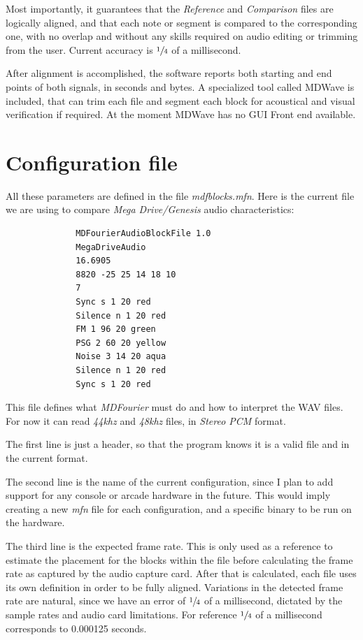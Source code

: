 \documentclass[10pt,a4paper]{report}
\begin{document}
Most importantly, it guarantees that the \textit{Reference} and \textit{Comparison} files are logically aligned, and that each note or segment is compared to the corresponding one, with no overlap and without any skills required on audio editing or trimming from the user. Current accuracy is $\sfrac{1}{4}$ of a millisecond.

After alignment is accomplished, the software reports both starting and end points of both signals, in seconds and bytes. A specialized tool called MDWave is included, that can trim each file and segment each block for acoustical and visual verification if required. At the moment MDWave has no GUI Front end available.

\section{Configuration file}
\label{mfnconfig}

All these parameters are defined in the file \textit{mdfblocks.mfn}. Here is the current file we are using to compare \textit{Mega Drive/Genesis} audio characteristics:

\begin{verbatim}
              MDFourierAudioBlockFile 1.0
              MegaDriveAudio
              16.6905
              8820 -25 25 14 18 10
              7
              Sync s 1 20 red
              Silence n 1 20 red
              FM 1 96 20 green
              PSG 2 60 20 yellow
              Noise 3 14 20 aqua
              Silence n 1 20 red
              Sync s 1 20 red
\end{verbatim}

This file defines what \textit{MDFourier} must do and how to interpret the WAV files. For now it can read \textit{44khz} and \textit{48khz} files, in \textit{Stereo PCM} format.

The first line is just a header, so that the program knows it is a valid file and in the current format.

The second line is the name of the current configuration, since I plan to add support for any console or arcade hardware in the future. This would imply creating a new \textit{mfn} file for each configuration, and a specific binary to be run on the hardware.

The third line is the expected frame rate. This is only used as a reference to estimate the placement for the blocks within the file before calculating the frame rate as captured by the audio capture card. After that is calculated, each file uses its own definition in order to be fully aligned. Variations in the detected frame rate are natural, since we have an error of $\sfrac{1}{4}$ of a millisecond, dictated by the sample rates and audio card limitations. For reference $\sfrac{1}{4}$ of a millisecond corresponds to 0.000125 seconds.
\end{document}
